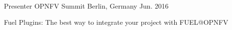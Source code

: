 

\begin{cventries}

  \cventry
    {Presenter} %
    {OPNFV Summit} %
    {Berlin, Germany} %
    {Jun. 2016} %
    {
      \begin{cvitems} %
        \item {Fuel Plugins: The best way to integrate your project with FUEL@OPNFV}
      \end{cvitems}
    }

\end{cventries}
